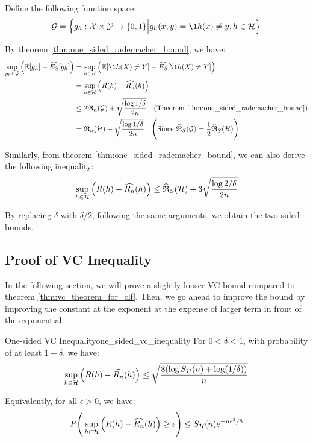 \begin{proof*}
    Define the following function space:
    \begin{align*}
        \G = \bigCurl{
            g_h : \X \times \Y \to \{0,1\} \Big| g_h(x, y) = \1{h(x)\ne y}, h\in\Hf
        }
    \end{align*}

    \noindent By theorem \ref{thm:one_sided_rademacher_bound}, we have:
    \begin{align*}
        \sup_{g_h\in\G} \bigRound{\E[g_h] - \widehat{E_S}[g_h]}
            &= \sup_{h\in\Hf} \bigRound{\E[\1{h(X)\ne Y}] - \widehat{E_S}[\1{h(X)\ne Y}]} \\
            &= \sup_{h\in\Hf} \bigRound{R(h) - \widehat{R_n}(h)} \\
            &\le 2\RC_n(\G) + \sqrt{\frac{\log 1/\delta}{2n}} \ \ \ (\text{Theorem \ref{thm:one_sided_rademacher_bound}}) \\
            &= \RC_n(\Hf) + \sqrt{\frac{\log 1/\delta}{2n}} \ \ \ \biggRound{
                \text{Since } \ERC_S(\G) = \frac{1}{2}\ERC_S(\Hf)
            }
    \end{align*}

    \noindent Similarly, from theorem \ref{thm:one_sided_rademacher_bound}, we can also derive the following inequality:
    \begin{align*}
        \sup_{h\in\mathcal{H}} \Big( R(h) - \widehat{R_n}(h) \Big) \le \widehat{\mathfrak{R}}_S(\mathcal{H}) + 3\sqrt{\frac{\log 2/\delta}{2n}}
    \end{align*}

    \noindent By replacing $\delta$ with $\delta/2$, following the same arguments, we obtain the two-sided bounds.
\end{proof*}

\subsection{Proof of VC Inequality}
\label{sec:proof_of_vc_inequality}

In the following section, we will prove a slightly looser VC bound compared to theorem \ref{thm:vc_theorem_for_clf}. Then, we go ahead to improve the bound by improving the constant at the exponent at the expense of larger term in front of the exponential.

\begin{theorem}{One-sided VC Inequality}{one_sided_vc_inequality}
    For $0 < \delta < 1$, with probability of at least $1-\delta$, we have:
    \begin{align*}
        \sup_{h\in\mathcal{H}} \Big( 
            R(h) - \widehat{R_n}(h)
         \Big) \le \sqrt{
            \frac{8(\log S_{\mathcal{H}}(n) + \log(1/\delta))}{n}
        }
    \end{align*}

    \noindent Equivalently, for all $\epsilon>0$, we have:
    \begin{align*}
        P\Bigg( 
            \sup_{h\in\mathcal{H}} \Big( 
                R(h) - \widehat{R_n}(h)
             \Big) \ge \epsilon
         \Bigg) \le S_{\mathcal{H}}(n)e^{-n\epsilon^2/8}
    \end{align*}
\end{theorem}

